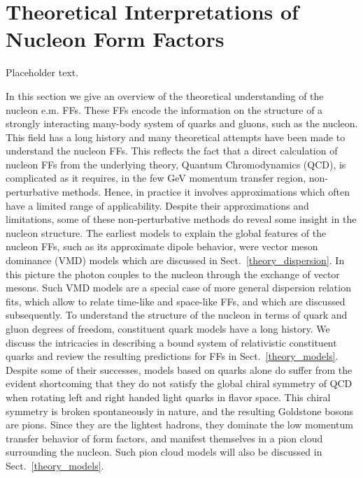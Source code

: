 {\tiny }\section{Theoretical Interpretations of Nucleon Form Factors}
\label{sec:theory}

Placeholder text.

In this section we give an overview of the theoretical understanding 
of the nucleon e.m. FFs. 
These FFs encode the information on the structure of a  
strongly interacting many-body system of quarks and gluons, 
such as the nucleon. 
This field has a long history and many theoretical 
attempts have been made to understand the nucleon FFs. 
This reflects the fact that a direct calculation of nucleon FFs from the 
underlying theory, Quantum Chromodynamics (QCD), is complicated as it 
requires, in the few GeV momentum transfer region,  
non-perturbative methods. Hence, in practice it involves approximations 
which often have a limited range of applicability. 
Despite their approximations and limitations, some of these non-perturbative 
methods do reveal some insight in the nucleon structure. 
\newline
\indent
The earliest models to explain the global features of the nucleon FFs, such 
as its approximate dipole behavior, were vector meson dominance (VMD) models 
which are discussed in Sect.~\ref{theory_dispersion}. 
In this picture the photon couples to the nucleon through the exchange of 
vector mesons. Such VMD models are a special case of more general dispersion 
relation fits, 
which allow to relate time-like and space-like FFs, and which are
discussed subsequently. 
\newline
\indent
To understand the structure of the nucleon in terms of quark and gluon degrees
of freedom, constituent quark models have a long history. We discuss the 
intricacies in describing a bound system of relativistic constituent quarks 
and review the resulting predictions for FFs in Sect.~\ref{theory_models}. 
Despite some of their successes, models based on quarks alone do suffer from 
the evident shortcoming that they do not satisfy the global chiral symmetry 
of QCD when rotating left and right handed light quarks in flavor space. 
This chiral symmetry is broken spontaneously in nature, 
and the resulting Goldstone bosons are pions. Since they are the lightest 
hadrons, they dominate the low momentum transfer behavior of form factors, 
and manifest themselves in a pion cloud surrounding the nucleon. Such pion
cloud models will also be discussed in Sect.~\ref{theory_models}. 
